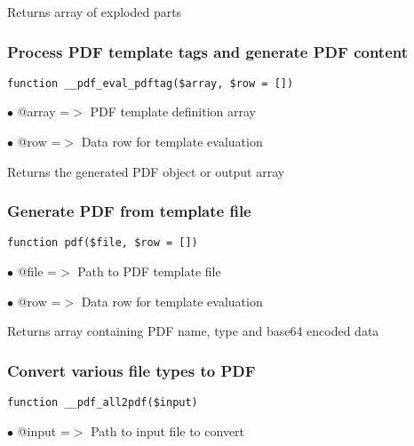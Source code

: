 \documentclass[a4paper]{article}
\begin{document}
Returns array of exploded parts

\hypertarget{toc513}{}
\subsubsection{Process PDF template tags and generate PDF content}

\begin{lstlisting}
function __pdf_eval_pdftag($array, $row = [])
\end{lstlisting}

\begin{compactitem}
\item[\color{myblue}$\bullet$] @array =$>$ PDF template definition array
\item[\color{myblue}$\bullet$] @row   =$>$ Data row for template evaluation
\end{compactitem}

Returns the generated PDF object or output array

\hypertarget{toc514}{}
\subsubsection{Generate PDF from template file}

\begin{lstlisting}
function pdf($file, $row = [])
\end{lstlisting}

\begin{compactitem}
\item[\color{myblue}$\bullet$] @file =$>$ Path to PDF template file
\item[\color{myblue}$\bullet$] @row  =$>$ Data row for template evaluation
\end{compactitem}

Returns array containing PDF name, type and base64 encoded data

\hypertarget{toc515}{}
\subsubsection{Convert various file types to PDF}

\begin{lstlisting}
function __pdf_all2pdf($input)
\end{lstlisting}

\begin{compactitem}
\item[\color{myblue}$\bullet$] @input =$>$ Path to input file to convert
\end{compactitem}
\end{document}
